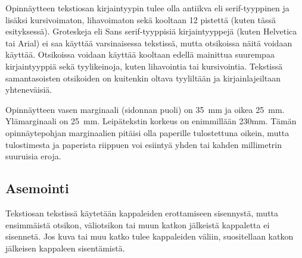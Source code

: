 \documentclass[english,12pt,a4paper,dvips]{article}
\begin{document}
Opinnäytteen tekstiosan kirjaintyypin tulee olla antiikva eli
serif\--tyyp\-pi\-nen ja lisäksi kursivoimaton, lihavoimaton sekä kooltaan 12
pistettä (kuten tässä esityksessä). Groteskeja eli \textsf{Sans
  serif}-tyyppisiä kirjaintyyppejä (kuten Helvetica tai Arial) ei saa
käyttää varsinaisessa tekstissä, mutta otsikoissa näitä voidaan
käyttää.  Otsikoissa voidaan käyttää kooltaan edellä mainittua
suurempaa kirjaintyyppiä sekä tyylikeinoja, kuten lihavointia tai
kursivointia.  Tekstissä samantasoisten otsikoiden on kuitenkin oltava
tyyliltään ja kirjainlajeiltaan yhteneväisiä.
\begin{table}[htb]
\caption{Taulukoissa ja kuvissa kirjaintyypin voi valita
tarkoituksenmukaisesti, mutta kuva- ja taulukkoteksteissä tulee
käyttää samaa kirjaintyyppiä kuin varsinaisessa tekstissä. 
Huomaa taulukon numeroinnin sijoittuminen taulukon yläpuolelle. \label{taulukko1}}
\begin{center}
\end{center}
\end{table}

Opinnäytteen vasen marginaali (sidonnan puoli) on
35~mm %
ja oikea 25~mm. Ylämarginaali on 25~mm. Leipätekstin korkeus on
enimmillään 230mm. Tämän opinnäytepohjan marginaalien pitäisi olla
paperille tulostettuna oikein, mutta tulostimesta ja paperista
riippuen voi esiintyä yhden tai kahden millimetrin suuruisia eroja.
\subsection*{Asemointi}

Tekstiosan tekstissä käytetään kappaleiden erottamiseen sisennystä,
mutta ensimmäistä otsikon, väliotsikon tai muun katkon jälkeistä
kappaletta ei sisennetä. Jos kuva tai muu katko tulee kappaleiden
väliin, suositellaan katkon jälkeisen kappaleen sisentämistä.
\end{document}
